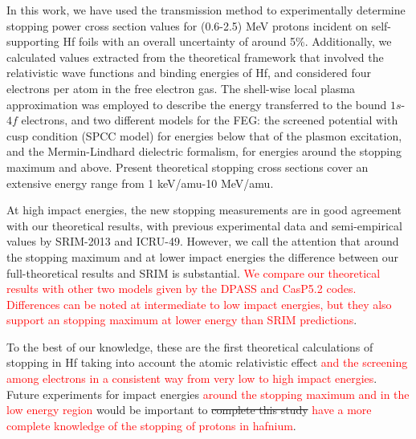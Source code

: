 \documentclass[aps,pra,reprint,superscriptaddress]{revtex4-1}
\def\clau#1{\textcolor{red}{#1}}
\begin{document}
In this work, we have used the transmission method to experimentally 
determine stopping power cross section values for (0.6-2.5) MeV protons 
incident on self-supporting Hf foils with an overall uncertainty of 
around 5\%. Additionally, we calculated values extracted from the 
theoretical framework that involved the relativistic wave functions and 
binding energies of Hf, and considered four electrons per atom in the free 
electron gas. The shell-wise local plasma approximation was employed to 
describe the energy transferred to the bound $1s$-$4f$ electrons, and 
two different models for the FEG: the screened potential with cusp 
condition (SPCC model) for energies below that of the plasmon 
excitation, and the Mermin-Lindhard dielectric formalism, for energies 
around the stopping maximum and above. Present theoretical stopping 
cross sections cover an extensive energy range from 1 keV/amu-10 MeV/amu.

At high impact energies, the new stopping  measurements are in good 
agreement with our theoretical results, with previous experimental data
and semi-empirical values by SRIM-2013 and ICRU-49.  However, we call 
the attention that around the stopping maximum and at lower impact 
energies the difference between our full-theoretical results and SRIM 
is substantial. \clau{We compare our theoretical results with other two models given by the DPASS and CasP5.2 codes. Differences can be noted at intermediate to low impact energies, but  they also support an stopping maximum at lower energy than SRIM predictions}. 

To the best of our knowledge, these are the first 
theoretical calculations of stopping in Hf taking into account the 
atomic relativistic effect \clau{and the screening among electrons in a consistent way from very low to high impact energies}. Future experiments for impact energies 
\clau{around the stopping maximum and in the low energy region} would be important to \st{complete  this study} \clau{have a more complete knowledge of the stopping of protons in hafnium}.
\end{document}
